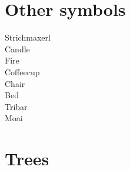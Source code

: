 \documentclass[]{article}
\begin{document}
\section{Other symbols}

\begin{flushleft}
Strichmaxerl \Strichmaxerl \\
Candle \Candle \\
Fire \Fire \\
Coffeecup \Coffeecup \\
Chair \Chair \\
Bed \Bed \\
Tribar \Tribar \\
Moai \Moai \\
\end{flushleft}


\section{Trees}
\end{document}

